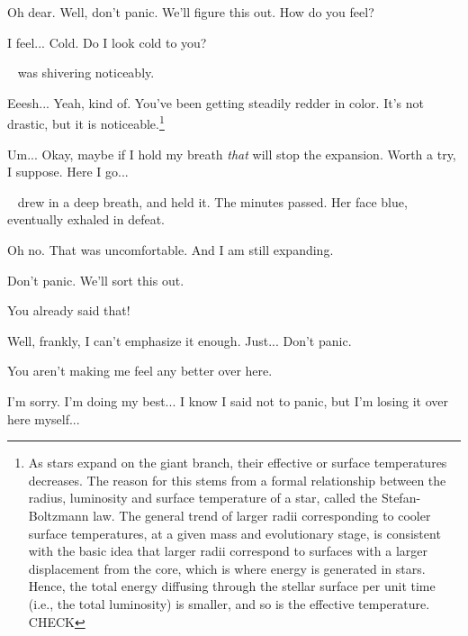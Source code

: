 \documentclass[main.tex]{subfiles}
\begin{document}
\par \Maia Oh dear.  Well, don't panic.  We'll figure this out.  How do you feel?

\par \Merope I feel... Cold.  Do I look cold to you?

\par \nar \rmmerope~ was shivering noticeably.

\par \Maia Eeesh... Yeah, kind of.  You've been getting steadily redder in color.  It's not drastic, but it is noticeable.\footnote{As stars expand on the giant branch, their effective or surface temperatures decreases.  The reason for this stems from a formal relationship between the radius, luminosity and surface temperature of a star, called the Stefan-Boltzmann law.  The general trend of larger radii corresponding to cooler surface temperatures, at a given mass and evolutionary stage, is consistent with the basic idea that larger radii correspond to surfaces with a larger displacement from the core, which is where energy is generated in stars.  Hence, the total energy diffusing through the stellar surface per unit time (i.e., the total luminosity) is smaller, and so is the effective temperature. CHECK}

\par \Merope Um... Okay, maybe if I hold my breath \textit{that} will stop the expansion.  Worth a try, I suppose.  Here I go...

\par \nar \rmmerope~ drew in a deep breath, and held it.  The minutes passed.  Her face blue, \rmmerope~ eventually exhaled in defeat.  

\par \Merope Oh no.  That was uncomfortable.  And I am still expanding.

\par \Maia Don't panic.  We'll sort this out.

\par \Merope You already said that!

\par \Maia Well, frankly, I can't emphasize it enough.  Just... Don't panic.

\par \Merope You aren't making me feel any better over here.

\par \Maia I'm sorry.  I'm doing my best... I know I said not to panic, but I'm losing it over here myself...  
\end{document}
